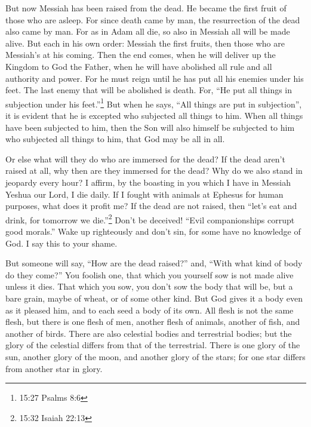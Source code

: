 \myverse{}But now Messiah has been raised from the dead. He became the
first fruit of those who are asleep.
\myverse{}For since death came by man, the resurrection of the dead also came by man.
\myverse{}For as in Adam all die, so also in Messiah all will be made alive.
\myverse{}But each in his own order: Messiah the first fruits, then those who are Messiah’s
at his coming.
\myverse{}Then the end comes, when he will deliver up the Kingdom to God the Father,
when he will have abolished all rule and all authority and power.
\myverse{}For he must reign until he has put all his enemies under his feet.
\myverse{}The last enemy that will be abolished is death.
\myverse{}For, “He put all things in subjection under his feet.”\footnote{15:27 Psalms 8:6} But when he says, “All things are put in subjection”,
it is evident that he is excepted who subjected all things to him.
\myverse{}When all things have been subjected to him, then the Son will also himself
be subjected to him who subjected all things to him, that God may be all in all.

\myverse{}Or else what will they do who are immersed for the dead? If
the dead aren’t raised at all, why then are they immersed for the dead?
\myverse{}Why do we also stand in jeopardy every hour?
\myverse{}I affirm, by the boasting in you which I have in Messiah Yeshua our Lord,
I die daily.
\myverse{}If I fought with animals at Ephesus for human purposes, what does it profit
me? If the dead are not raised, then “let’s eat and drink, for tomorrow we die.”\footnote{15:32 Isaiah 22:13}
\myverse{}Don’t be deceived! “Evil companionships corrupt good morals.”
\myverse{}Wake up righteously and don’t sin, for some have no knowledge of God. I say
this to your shame.

\myverse{}But someone will say, “How are the dead raised?” and, “With
what kind of body do they come?”
\myverse{}You foolish one, that which you yourself sow is not made alive unless it
dies.
\myverse{}That which you sow, you don’t sow the body that will be, but a bare grain,
maybe of wheat, or of some other kind.
\myverse{}But God gives it a body even as it pleased him, and to each seed a body of
its own.
\myverse{}All flesh is not the same flesh, but there is one flesh of men, another flesh
of animals, another of fish, and another of birds.
\myverse{}There are also celestial bodies and terrestrial bodies; but the glory of
the celestial differs from that of the terrestrial.
\myverse{}There is one glory of the sun, another glory of the moon, and another glory
of the stars; for one star differs from another star in glory.

